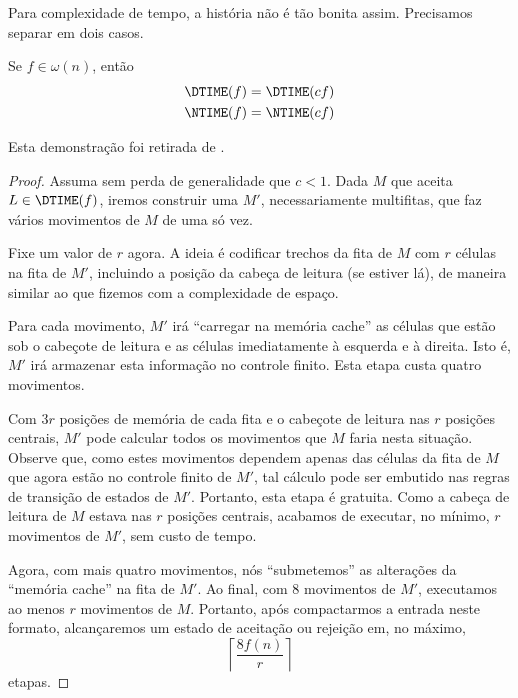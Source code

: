 Para complexidade de tempo,
a história não é tão bonita assim.
Precisamos separar em dois casos.

\begin{theorem}
    Se $f \in \omega(n)$, então
    \begin{align*}
        \DTIME(f) &= \DTIME(cf) \\
        \NTIME(f) &= \NTIME(cf)
    \end{align*}
\end{theorem}

Esta demonstração foi retirada de \cite[p. 290]{HopcroftUllman1979}.

\begin{proof}
    Assuma sem perda de generalidade que $c < 1$.
    Dada $M$ que aceita $L \in \DTIME(f)$,
    iremos construir uma $M'$,
    necessariamente multifitas,
    que faz vários movimentos de $M$ de uma só vez.

    Fixe um valor de $r$ agora.
    A ideia é codificar trechos da fita de $M$
    com $r$ células
    na fita de $M'$,
    incluindo a posição da cabeça de leitura
    (se estiver lá),
    de maneira similar ao que fizemos com a complexidade de espaço.

    Para cada movimento,
    $M'$ irá ``carregar na memória cache''
    as células que estão sob o cabeçote de leitura
    e as células imediatamente à esquerda e à direita.
    Isto é, $M'$ irá armazenar esta informação
    no controle finito.
    Esta etapa custa quatro movimentos.

    Com $3r$ posições de memória de cada fita
    e o cabeçote de leitura nas $r$ posições centrais,
    $M'$ pode calcular todos os movimentos que $M$ faria nesta situação.
    Observe que,
    como estes movimentos dependem apenas
    das células da fita de $M$
    que agora estão no controle finito de $M'$,
    tal cálculo pode ser embutido nas regras de transição de estados de $M'$.
    Portanto, esta etapa é gratuita.
    Como a cabeça de leitura de $M$ estava nas $r$ posições centrais,
    acabamos de executar,
    no mínimo,
    $r$ movimentos de $M'$,
    sem custo de tempo.

    Agora, com mais quatro movimentos,
    nós ``submetemos'' as alterações da ``memória cache''
    na fita de $M'$.
    Ao final, com $8$ movimentos de $M'$,
    executamos ao menos $r$ movimentos de $M$.
    Portanto, após compactarmos a entrada
    neste formato,
    alcançaremos um estado de aceitação ou rejeição
    em, no máximo,
    \begin{equation*}
        \left\lceil \frac{8f(n)}{r} \right\rceil
    \end{equation*}
    etapas.


\end{proof}

